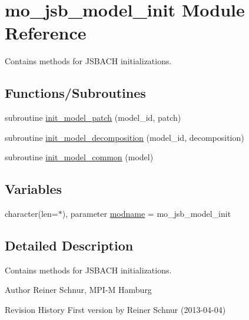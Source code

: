 \hypertarget{namespacemo__jsb__model__init}{}\section{mo\+\_\+jsb\+\_\+model\+\_\+init Module Reference}
\label{namespacemo__jsb__model__init}


Contains methods for J\+S\+B\+A\+C\+H initializations.  


\subsection*{Functions/\+Subroutines}
\begin{DoxyCompactItemize}
\item 
subroutine \hyperlink{namespacemo__jsb__model__init_abde13ff24f002945132bb153233d61ea}{init\+\_\+model\+\_\+patch} (model\+\_\+id, patch)
\item 
subroutine \hyperlink{namespacemo__jsb__model__init_adca97e8b4accd7231a2461e78399ee71}{init\+\_\+model\+\_\+decomposition} (model\+\_\+id, decomposition)
\item 
subroutine \hyperlink{namespacemo__jsb__model__init_adfe552aef42349bce64eb6bbd05e01e7}{init\+\_\+model\+\_\+common} (model)
\end{DoxyCompactItemize}
\subsection*{Variables}
\begin{DoxyCompactItemize}
\item 
character(len=$\ast$), parameter \hyperlink{namespacemo__jsb__model__init_a1b4f5a568975c096385432c5e8a209f0}{modname} = \textquotesingle{}mo\+\_\+jsb\+\_\+model\+\_\+init\textquotesingle{}
\end{DoxyCompactItemize}


\subsection{Detailed Description}
Contains methods for J\+S\+B\+A\+C\+H initializations. 

\begin{DoxyAuthor}{Author}
Reiner Schnur, M\+P\+I-\/\+M Hamburg
\end{DoxyAuthor}
\begin{DoxyParagraph}{Revision History}
First version by Reiner Schnur (2013-\/04-\/04) 
\end{DoxyParagraph}


